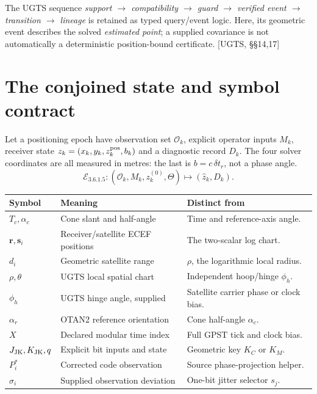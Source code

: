 \documentclass[11pt,a4paper]{article}
\newcommand{\uRef}[1]{\textcolor{muted}{[UGTS, #1]}}
\begin{document}
The UGTS sequence \emph{support $\to$ compatibility $\to$ guard $\to$ verified event $\to$ transition $\to$ lineage}
is retained as typed query/event logic. Here, its geometric event describes the solved \emph{estimated point};
a supplied covariance is not automatically a deterministic position-bound certificate. \uRef{\S\S14,17}
\clearpage
\begingroup
\small
\setlength{\parskip}{0pt}
\tableofcontents
\endgroup
\clearpage

\section{The conjoined state and symbol contract}
Let a positioning epoch have observation set $\mathcal O_k$, explicit operator inputs $M_k$, receiver state
$z_k=(x_k,y_k,z_k^{\rm pos},b_k)$ and a diagnostic record $D_k$. The four solver coordinates are all measured
in metres: the last is $b=c\,\delta t_r$, not a phase angle.
\begin{equation}
\mathcal E_{3.6.1.5}:(\mathcal O_k,M_k,z_k^{(0)},\Theta)\longmapsto(\hat z_k,D_k).
\end{equation}
\par\small
\begin{tabularx}{\textwidth}{@{}P{.18\textwidth}P{.30\textwidth}Y@{}}\toprule
\textbf{Symbol} & \textbf{Meaning} & \textbf{Distinct from}\\\midrule
$T_c,\alpha_c$ & Cone slant and half-angle & Time and reference-axis angle.\\
$\mathbf r,\mathbf s_i$ & Receiver/satellite ECEF positions & The two-scalar log chart.\\
$d_i$ & Geometric satellite range & $\rho$, the logarithmic local radius.\\
$\rho,\theta$ & UGTS local spatial chart & Independent hoop/hinge $\phi_h$.\\
$\phi_h$ & UGTS hinge angle, supplied & Satellite carrier phase or clock bias.\\
$\alpha_r$ & OTAN2 reference orientation & Cone half-angle $\alpha_c$.\\
$X$ & Declared modular time index & Full GPST tick and clock bias.\\
$J_{\rm JK},K_{\rm JK},q$ & Explicit bit inputs and state & Geometric key $K_C$ or $K_M$.\\
$P_i^*$ & Corrected code observation & Source phase-projection helper.\\
$\sigma_i$ & Supplied observation deviation & One-bit jitter selector $s_j$.\\\bottomrule
\end{tabularx}
\par\normalsize
\end{document}
